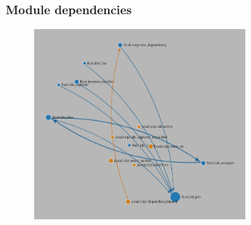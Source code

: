 \begin{frame}
  \frametitle{Module dependencies}
  \begin{figure}
    \centering
      \includegraphics[width=0.7\textwidth]{./pics/module-dependencies.png}
  \end{figure}
\end{frame}

